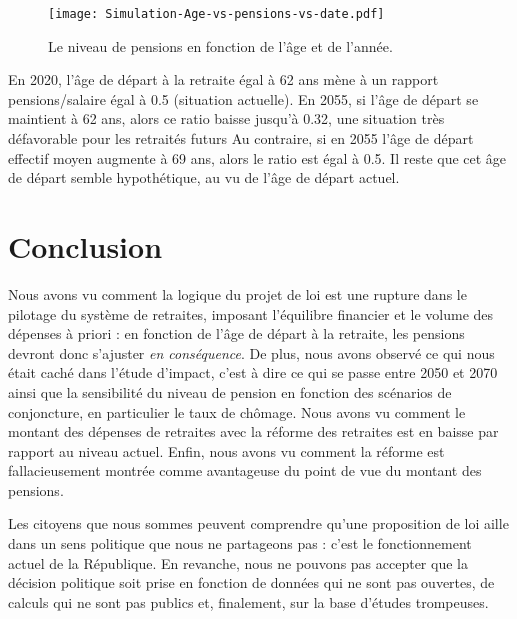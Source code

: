 \documentclass[10pt]{article}
\begin{document}
\begin{figure}
\begin{center}
\texttt{[image: Simulation-Age-vs-pensions-vs-date.pdf]}
\end{center}

\caption{Le niveau de pensions en fonction de l'âge et de l'année.}
\label{fig-simulation-age-vs-pensions}
\end{figure}

En 2020, l'âge de départ à la retraite égal à 62 ans 
mène à un rapport pensions/salaire égal à 0.5 (situation actuelle).  
En 2055, si l'âge de départ se maintient à 62 ans, alors ce ratio baisse jusqu'à 0.32, 
une situation très défavorable pour les retraités futurs
Au contraire, si en 2055 l'âge de départ effectif moyen augmente à 69 ans, 
alors le ratio est égal à 0.5. 
Il reste que cet âge de départ semble hypothétique, au vu de l'âge de départ actuel. 


\section{Conclusion}

Nous avons vu comment la logique du projet de loi est une 
rupture dans le pilotage du système de retraites, 
imposant l'équilibre financier et le volume des dépenses 
à priori : en fonction de l'âge de départ à la retraite, 
les pensions devront donc s'ajuster \emph{en conséquence}. 
De plus, nous avons observé ce qui nous était caché dans l'étude 
d'impact, c'est à dire ce qui se passe entre 2050 et 2070 ainsi que 
la sensibilité du niveau de pension en fonction des scénarios 
de conjoncture, en particulier le taux de chômage. 
Nous avons vu comment le montant des dépenses de retraites avec la réforme 
des retraites est en baisse par rapport au niveau actuel. 
Enfin, nous avons vu comment la réforme est fallacieusement 
montrée comme avantageuse du point de vue du montant des pensions. 

Les citoyens que nous sommes peuvent comprendre qu'une proposition de loi 
aille dans un sens politique que nous ne partageons pas : c'est le 
fonctionnement actuel de la République. 
En revanche, nous ne pouvons pas accepter que la décision politique soit 
prise en fonction de données qui ne sont pas ouvertes, 
de calculs qui ne sont pas publics et, finalement, sur la base d'études trompeuses. 
\end{document}
